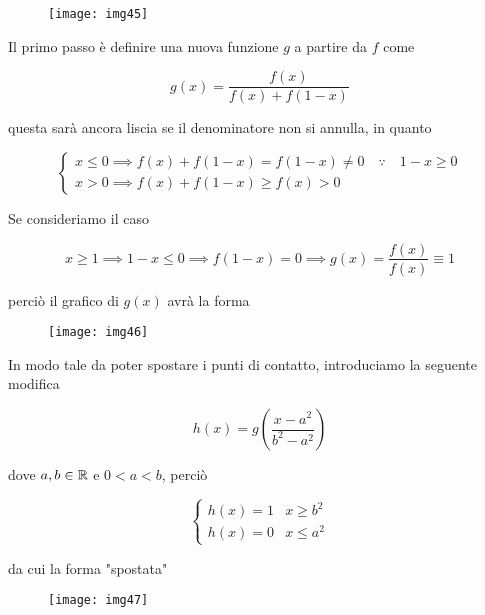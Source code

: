 \begin{figure}[H]
	\centering
	\texttt{[image: img45]}
\end{figure}

Il primo passo è definire una nuova funzione $ g $ a partire da $ f $ come


\begin{equation}
	g(x) = \dfrac{f(x)}{f(x) + f(1-x)}
\end{equation}

questa sarà ancora liscia se il denominatore non si annulla, in quanto

\begin{equation}
	\begin{cases}
		x \leqslant 0 \implies f(x) + f(1-x) = f(1-x) \neq 0 \quad \because \quad 1-x \geqslant 0\\
		x > 0 \implies f(x) + f(1-x) \geqslant f(x) > 0
	\end{cases}
\end{equation}

Se consideriamo il caso

\begin{equation}
	x \geqslant 1 \implies 1-x \leqslant 0 \implies f(1-x)=0 \implies g(x) = \dfrac{f(x)}{f(x)} \equiv 1
\end{equation}

perciò il grafico di $ g(x) $ avrà la forma

\begin{figure}[H]
	\centering
	\texttt{[image: img46]}
\end{figure}

In modo tale da poter spostare i punti di contatto, introduciamo la seguente modifica

\begin{equation}
	h(x) = g \left( \dfrac{x - a^{2}}{b^{2} - a^{2}} \right)
\end{equation}

dove $ a,b \in \mathbb{R} $ e $ 0 < a < b $, perciò

\begin{equation}
	\begin{cases}
		h(x) = 1 & x \geqslant b^{2}\\
		h(x) = 0 & x \leqslant a^{2}
	\end{cases}
\end{equation}

da cui la forma "spostata"

\begin{figure}[H]
	\centering
	\texttt{[image: img47]}
\end{figure}

